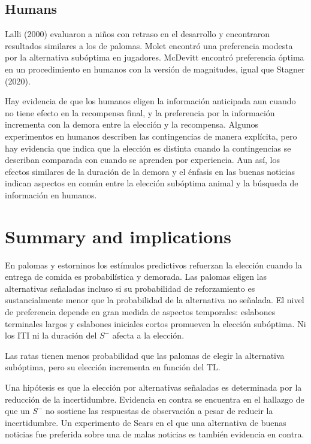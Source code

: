 \documentclass[a4paper,12pt]{article}
\begin{document}
\subsection{Humans}

Lalli (2000) evaluaron a niños con retraso en el desarrollo y encontraron resultados similares a los de palomas.
Molet encontró una preferencia modesta por la alternativa subóptima en jugadores.
McDevitt encontró preferencia óptima en un procedimiento en humanos con la versión de magnitudes, igual que Stagner (2020).

Hay evidencia de que los humanos eligen la información anticipada aun cuando no tiene efecto en la recompensa final, y la preferencia por la información incrementa con la demora entre la elección y la recompensa.
Algunos experimentos en humanos describen las contingencias de manera explícita, pero hay evidencia que indica que la elección es distinta cuando la contingencias se describan comparada con cuando se aprenden por experiencia.
Aun así, los efectos similares de la duración de la demora y el énfasis en las buenas noticias indican aspectos en común entre la elección subóptima animal y la búsqueda de información en humanos.

\section{Summary and implications}

En palomas y estorninos los estímulos predictivos refuerzan la elección cuando la entrega de comida es probabilística y demorada.
Las palomas eligen las alternativas señaladas incluso si su probabilidad de reforzamiento es sustancialmente menor que la probabilidad de la alternativa no señalada.
El nivel de preferencia depende en gran medida de aspectos temporales: eslabones terminales largos y eslabones iniciales cortos promueven la elección subóptima.
Ni los ITI ni la duración del $S^{-}$ afecta a la elección.

Las ratas tienen menos probabilidad que las palomas de elegir la alternativa subóptima, pero su elección incrementa en función del TL.

Una hipótesis es que la elección por alternativas señaladas es determinada por la reducción de la incertidumbre.
Evidencia en contra se encuentra en el hallazgo de que un $S^{-}$ no sostiene las respuestas de observación a pesar de reducir la incertidumbre.
Un experimento de Sears en el que una alternativa de buenas noticias fue preferida sobre una de malas noticias es también evidencia en contra.
\end{document}
